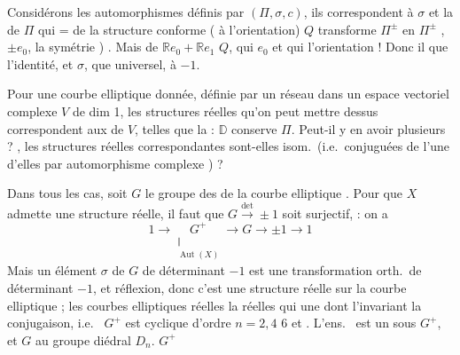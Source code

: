 \documentclass[11pt,a4paper]{article}
\begin{document}
Considérons les automorphismes \struck{\ill{}} 
définis par $(\Pi, \sigma, c)$, ils correspondent \struck{\ill{}} 
 \ill{}  à $\sigma$ et
 la \ill{} de $\Pi$ qui  \struck{\ill{}} \ill{} =  de la
structure conforme ( à l'orientation) \struck{\ill{}}
\ill{} $Q$ transforme $\Pi^{\pm}$ en $\Pi^{\pm}$ \struck{\ill{}}, \ill{}
\ill{} $\pm e_{0}$, \ill{} \ill{} \struck{\ill{}} \ill{} la symétrie
\ill{}) \ill{} \ill{}. Mais \ill{} \ill{} \ill{} de
$\mathbb{R} e_{0} + \mathbb{R} e_{1}$  $Q$, qui
 $e_{0}$ et qui \ill{} 
l'orientation ! Donc il  que l'identité, et $\sigma$,
\struck{\ill{}} \ill{} que  universel,
 à $-1$.

Pour une courbe elliptique  donnée, définie par un réseau
\add{$\Pi$} dans un espace vectoriel complexe $V$ de dim 1, les structures
réelles qu'on peut mettre dessus correspondent aux \struck{\ill{}}
 \ill{} de $V$, telles que la 
  \ill{} : $\mathbb{D}$ conserve $\Pi$.
Peut-il y en avoir plusieurs ? , les structures réelles
correspondantes sont-elles isom.\ (i.e.\ conjuguées de l'une d'elles par
\ill{} automorphisme complexe \ill{}) ? 

 \struck{\ill{}} Dans tous les cas, soit $G$ le groupe des
  de la courbe
elliptique . Pour que \struck{\ill{}} $X$ admette une
structure réelle, il faut \struck{\ill{}}  que
$G \xrightarrow{\det} \pm 1$ soit surjectif, \ill{} \ill{} \ill{} : on a
\[
  1 \longrightarrow \underset{\substack{\Vert \\ \operatorname{Aut}(X)}}{G^{+}}
  \longrightarrow G \longrightarrow \pm 1 \longrightarrow 1
\]
Mais un élément $\sigma$ de $G$ de déterminant $-1$ est une transformation
orth.\ de déterminant $-1$, et  réflexion, donc c'est une
structure réelle sur la courbe elliptique ; les courbes elliptiques réelles
 la \ill{}  réelles \ill{} \ill{} qui
 une \ill{} \ill{}  dont l'invariant
\ill{} \ill{}  la conjugaison, i.e.\ \struck{\ill{}} $G^{+}$ est
cyclique d'ordre \struck{\ill{}} $n = 2, 4$  $6$ et
. L'ens.\  \struck{\ill{}}
\ill{} est un  sous $G^{+}$, 
et $G$ \ill{} \struck{\ill{}}  au groupe diédral
$D_{n}$. $G^{+}$ \ill{}
\end{document}
